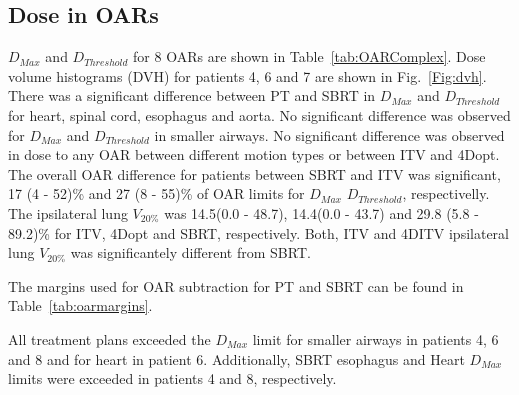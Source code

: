\begin{table}[H]
\begin{tabular}{c|c|c|c|c}
\hline\hline
	\end{tabular}
	\label{tab:resultsComplex}
\end{table}
\newpage
\subsection{Dose in OARs}

$D_{Max}$ and $D_{Threshold}$ for 8 OARs are shown in Table~\ref{tab:OARComplex}. Dose volume histograms (DVH) for patients 4, 6 and 7 are shown in Fig.~\ref{Fig:dvh}.
There was a significant difference between PT and SBRT in $D_{Max}$ and $D_{Threshold}$ 
for heart, spinal cord, esophagus and aorta. No significant difference was observed for $D_{Max}$ and $D_{Threshold}$ in smaller airways.
No significant difference was observed in dose to any OAR between different motion types or between ITV and 4Dopt.
The overall OAR difference for patients between SBRT and ITV
was significant, 17 (4 - 52)\% and 27 (8 - 55)\% of OAR limits for $D_{Max}$ $D_{Threshold}$, respectivelly.
The ipsilateral lung $V_{20\%}$ was 14.5(0.0 - 48.7), 14.4(0.0 - 43.7) and 29.8 (5.8 - 89.2)\% for ITV, 4Dopt and SBRT, respectively. Both, ITV and 4DITV ipsilateral lung $V_{20\%}$ was
significantely different from SBRT.

The margins used for OAR subtraction for PT and SBRT can be found in Table~\ref{tab:oarmargins}.

All treatment plans exceeded the $D_{Max}$ limit for smaller airways in patients 4, 6 and 8 and for heart in patient 6. 
Additionally, SBRT esophagus and Heart $D_{Max}$ limits were exceeded in patients 4 and 8, respectively.


